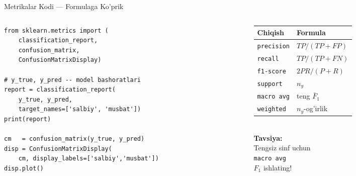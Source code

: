 \documentclass[aspectratio=169,11pt]{beamer}
\begin{document}
\begin{frame}[fragile]{Metrikalar Kodi --- Formulaga Ko'prik}
  \begin{columns}[T]
    \begin{column}{0.57\textwidth}
\begin{lstlisting}
from sklearn.metrics import (
    classification_report,
    confusion_matrix,
    ConfusionMatrixDisplay)

# y_true, y_pred -- model bashoratlari
report = classification_report(
    y_true, y_pred,
    target_names=['salbiy', 'musbat'])
print(report)

cm   = confusion_matrix(y_true, y_pred)
disp = ConfusionMatrixDisplay(
    cm, display_labels=['salbiy','musbat'])
disp.plot()
\end{lstlisting}
    \end{column}
    \begin{column}{0.40\textwidth}
      \small
      \begin{tabular}{@{}ll@{}}
        \toprule
        Chiqish & Formula \\
        \midrule
        \texttt{precision} & $TP/(TP+FP)$ \\
        \texttt{recall}    & $TP/(TP+FN)$ \\
        \texttt{f1-score}  & $2PR/(P+R)$ \\
        \texttt{support}   & $n_y$ \\
        \texttt{macro avg} & teng $\bar{F}_1$ \\
        \texttt{weighted}  & $n_y$-og'irlik \\
        \bottomrule
      \end{tabular}
      \vspace{5pt}\\
      \small\textbf{Tavsiya:}\\
      Tengsiz sinf uchun\\
      \texttt{macro avg}\\
      $F_1$ ishlating!
    \end{column}
  \end{columns}
\end{frame}
\end{document}
